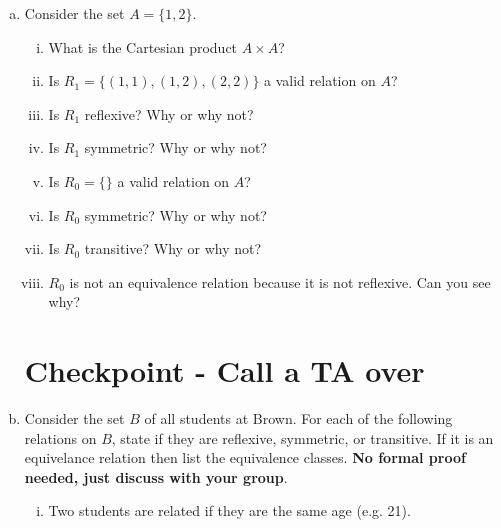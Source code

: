 \documentclass[12pt,letterpaper]{article}
\newif\ifsol
\newcommand{\solu}[2]{ \begin{mdframed} \ifsol #2 \else \vspace{#1} \fi \end{mdframed} }
\begin{document}
	\begin{enumerate}[a.]
		\item Consider the set $A = \{1,2\}$.
			\begin{enumerate}[i.]
				\item What is the Cartesian product $A \times A$?

				\solu{3cm}{$\{(1,1), (1,2),(2,1),(2,2)\}$}

				\item Is  $R_1 = \{(1,1),(1,2),(2,2)\}$ a valid relation on $A$?
				
				\solu{1cm}{Yes}

				\item Is $R_1$ reflexive? Why or why not?
				
				\solu{1cm}{Yes}

				\item Is $R_1$ symmetric? Why or why not?


				\solu{1cm}{No, needs $(2,1)$.}

				\item Is  $R_0 = \{\}$ a valid relation on $A$?


				\solu{1cm}{Yes}

				\item Is $R_0$ symmetric? Why or why not?
				
				\solu{1cm}{Yes}

				\item Is $R_0$ transitive? Why or why not?

				\solu{1cm}{Yes}

				\item 	$R_0$ is not an equivalence relation because it is not reflexive. Can you see why?
				
				\solu{1cm}{No. Not reflexive.}
	
			\end{enumerate}

		\section*{Checkpoint - Call a TA over}

		\item Consider the set $B$ of all students at Brown. For each of the following relations on $B$, state if they are reflexive, symmetric, or transitive. If it is an equivelance relation then list the equivalence classes. \textbf{No formal proof needed, just discuss with your group}.

		\begin{enumerate}[i.]
			\item Two students are related if they are the same age (e.g. 21).



\end{enumerate}
\end{enumerate}
\end{document}
